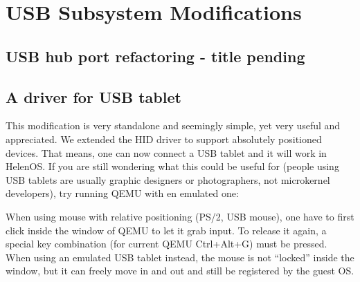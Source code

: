 \chapter{USB Subsystem Modifications}
\label{usb-refactoring}





\section{USB hub port refactoring - title pending}
\label{hub-port-refactoring}



\section{A driver for USB tablet}

This modification is very standalone and seemingly simple, yet very useful and
appreciated. We extended the HID driver to support absolutely positioned
devices. That means, one can now connect a USB tablet and it will work in
HelenOS. If you are still wondering what this could be useful for (people using
USB tablets are usually graphic designers or photographers, not microkernel
developers), try running QEMU with en emulated one:


When using mouse with relative positioning (PS/2, USB mouse), one have to first
click inside the window of QEMU to let it grab input. To release it again,
a special key combination (for current QEMU Ctrl+Alt+G) must be pressed. When
using an emulated USB tablet instead, the mouse is not ``locked'' inside the
window, but it can freely move in and out and still be registered by the guest
OS.

